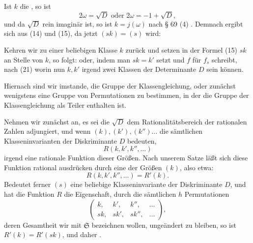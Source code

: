 
Ist $k$ die , so ist
\[
2\omega = \sqrt{D} \text{ oder } 2\omega = -1+\sqrt{D},
\]
und da $\sqrt{D}$ rein imaginär ist, so ist $k=j(\omega)$ nach § 69 (4) . %
Demnach ergibt sich aus (14) und (15), da jetzt $(sk)=(s)$ wird:


Kehren wir zu einer beliebigen Klasse $k$ zurück und setzen in der Formel (15) $sk$ an Stelle von $k$, so folgt:
oder, indem man $sk=k'$ setzt und $f$ für $f_s$ schreibt, nach (21) %
worin nun $k, k'$ irgend zwei Klassen der Determinante $D$ sein können.

Hiernach sind wir imstande, die  Gruppe der Klassengleichung, oder zunächst wenigstens eine Gruppe von Permutationen zu bestimmen, in der die Gruppe der Klassengleichung als Teiler enthalten ist.

Nehmen wir zunächst an, es sei die $\sqrt{D}$ dem Rationalitätsbereich der rationalen Zahlen adjungiert, und wenn $(k), (k'), (k'')\ldots$ die sämtlichen Klasseninvarianten der Diskriminante $D$ bedeuten,
\[
R(k, k', k'', \ldots)
\]
irgend eine rationale Funktion dieser Größen. Nach unserem Satze läßt sich diese Funktion rational ausdrücken durch eine der Größen $(k)$, also etwa:
\[
R(k, k', k'', \ldots) = R'(k).
\]
Bedeutet ferner $(s)$ eine beliebige Klasseninvariante der Diskriminante $D$, und hat die Funktion $R$ die Eigenschaft, durch die sämtlichen $h$ Permutationen
\[
\begin{pmatrix} k, & k', & k'', & \ldots \\ sk, & sk', & sk'', & \ldots \end{pmatrix},
\]
deren Gesamtheit wir mit $\mathfrak{S}$ bezeichnen wollen, ungeändert zu bleiben, so ist $R'(k)=R'(sk)$, und daher .

